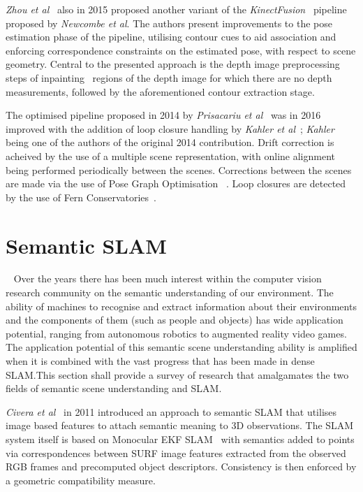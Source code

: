 \textit{Zhou et al}~\cite{Zhou2015} also in 2015 proposed another variant of the 
\textit{KinectFusion}~\cite{Newcombe2011} pipeline proposed by \textit{Newcombe et al}. 
The authors present improvements to the pose estimation phase of the pipeline, utilising 
contour cues to aid association and enforcing correspondence constraints on the estimated 
pose, with respect to scene geometry. Central to the presented approach is the depth image 
preprocessing steps of inpainting~\cite{Bertalmio2000} regions of the depth image for which 
there are no depth measurements, followed by the aforementioned contour extraction stage.

The optimised pipeline proposed in 2014 by \textit{Prisacariu et al}~\cite{Prisacariu2014} was 
in 2016 improved with the addition of loop closure handling by \textit{Kahler et al}~\cite{Kahler2016}; 
\textit{Kahler} being one of the authors of the original 2014 contribution. Drift correction is acheived 
by the use of a multiple scene representation, with online alignment being performed periodically 
between the scenes. Corrections between the scenes are made via the use of Pose Graph Optimisation 
~\cite{Grisetti2010}. Loop closures are detected by the use of Fern Conservatories~\cite{Glocker2014}.

\section{Semantic SLAM}
~\label{sec:lit_review_semantic}
Over the years there has been much interest within the computer vision research community on 
the semantic understanding of our environment. The ability of machines to recognise and extract 
information about their environments and the components of them (such as people and objects) has 
wide application potential, ranging from autonomous robotics to augmented reality video games. 
The application potential of this semantic scene understanding ability is amplified when it is 
combined with the vast progress that has been made in dense SLAM.\@ This section shall provide a 
survey of research that amalgamates the two fields of semantic scene understanding and SLAM.\@

\textit{Civera et al}~\cite{Civera2011} in 2011 introduced an approach to semantic SLAM 
that utilises image based features to attach semantic meaning to 3D observations. The SLAM 
system itself is based on Monocular EKF SLAM~\cite{Smith1990} with semantics added to points via 
correspondences between SURF\cite{Bay2006} image features extracted from the observed RGB frames and 
precomputed object descriptors. Consistency is then enforced by a geometric compatibility 
measure.

